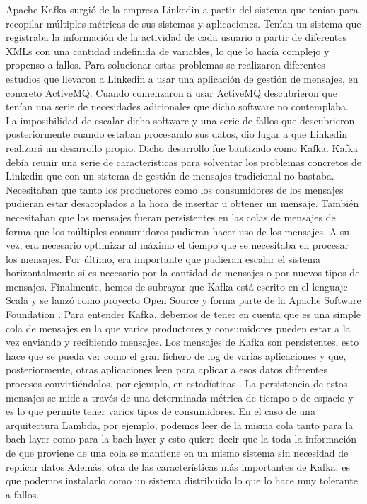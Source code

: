 Apache Kafka surgió de la empresa Linkedin a partir del sistema que tenían para recopilar múltiples métricas de sus sistemas y aplicaciones. Tenían un sistema que registraba la información de la actividad de cada usuario a partir de diferentes XMLs con una cantidad indefinida de variables, lo que lo hacía complejo y propenso a fallos. Para solucionar estas problemas se realizaron diferentes estudios que llevaron a Linkedin a usar una aplicación de gestión de mensajes, en concreto ActiveMQ. Cuando comenzaron a usar ActiveMQ descubrieron que tenían una serie de necesidades adicionales que dicho software no contemplaba. La imposibilidad de escalar dicho software y una serie de fallos que descubrieron posteriormente cuando estaban procesando sus datos, dio lugar a que Linkedin realizará un desarrollo propio. Dicho desarrollo fue bautizado como Kafka. Kafka debía reunir una serie de características para solventar los problemas concretos de Linkedin que con un sistema de gestión de mensajes tradicional no bastaba. Necesitaban que tanto los productores como los consumidores de los mensajes pudieran estar desacoplados a la hora de insertar u obtener un mensaje. También necesitaban que los mensajes fueran persistentes en las colas de mensajes de forma que los múltiples consumidores pudieran hacer uso de los mensajes. A su vez, era necesario optimizar al máximo el tiempo que se necesitaba en procesar los mensajes. Por último, era importante que pudieran escalar el sistema horizontalmente si es necesario por la cantidad de mensajes o por nuevos tipos de mensajes. Finalmente, hemos de subrayar que Kafka está escrito en el lenguaje Scala y se lanzó como proyecto Open Source y forma parte de la Apache Software Foundation \cite{Kfk-1}. 
Para entender Kafka, debemos de tener en cuenta que es una simple cola de mensajes en la que varios productores y consumidores pueden estar a la vez enviando y recibiendo mensajes. Los mensajes de Kafka son persistentes, esto hace que se pueda ver como el gran fichero de log de varias aplicaciones y que, posteriormente, otras aplicaciones leen para aplicar a esos datos diferentes procesos convirtiéndolos, por ejemplo, en estadísticas \cite{Kfk-6}. La persistencia de estos mensajes se mide a través de una determinada métrica de tiempo o de espacio y es lo que permite tener varios tipos de consumidores. En el caso de una arquitectura Lambda, por ejemplo, podemos leer de la misma cola tanto para la bach layer como para la bach layer y esto quiere decir que la toda la información de que proviene de una cola se mantiene en un mismo sistema sin necesidad de replicar datos.Además, otra de las características más importantes de Kafka, es que podemos instalarlo como un sistema distribuido lo que lo hace muy tolerante a fallos.\par

